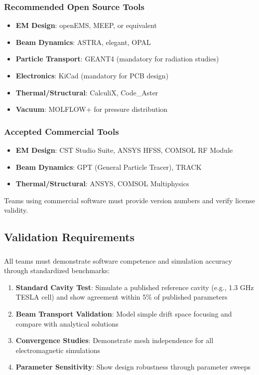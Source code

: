 \subsubsection{Recommended Open Source Tools}
\begin{itemize}[noitemsep]
    \item \textbf{EM Design}: openEMS, MEEP, or equivalent
    \item \textbf{Beam Dynamics}: ASTRA, elegant, OPAL
    \item \textbf{Particle Transport}: GEANT4 (mandatory for radiation studies)
    \item \textbf{Electronics}: KiCad (mandatory for PCB design)
    \item \textbf{Thermal/Structural}: CalculiX, Code\_Aster
    \item \textbf{Vacuum}: MOLFLOW+ for pressure distribution
\end{itemize}

\subsubsection{Accepted Commercial Tools}
\begin{itemize}[noitemsep]
    \item \textbf{EM Design}: CST Studio Suite, ANSYS HFSS, COMSOL RF Module
    \item \textbf{Beam Dynamics}: GPT (General Particle Tracer), TRACK
    \item \textbf{Thermal/Structural}: ANSYS, COMSOL Multiphysics
\end{itemize}

Teams using commercial software must provide version numbers and verify license validity.

\subsection{Validation Requirements}

\subsubsection{}
All teams must demonstrate software competence and simulation accuracy through standardized benchmarks:

\begin{enumerate}[noitemsep]
    \item \textbf{Standard Cavity Test}: Simulate a published reference cavity (e.g., 1.3 GHz TESLA cell) and show agreement within 5\% of published parameters
    \item \textbf{Beam Transport Validation}: Model simple drift space focusing and compare with analytical solutions
    \item \textbf{Convergence Studies}: Demonstrate mesh independence for all electromagnetic simulations
    \item \textbf{Parameter Sensitivity}: Show design robustness through parameter sweeps
\end{enumerate}

